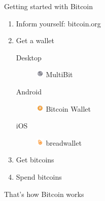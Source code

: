 \documentclass[12pt, usepdftitle=false]{beamer}
\begin{document}
\begin{frame}{Getting started with Bitcoin}
\begin{enumerate}
\pause\item Inform yourself: \alert{bitcoin.org}
\pause\item Get a wallet
\begin{description}
\item[Desktop] \includegraphics[height=1em]{multibit} MultiBit
\item[Android] \includegraphics[height=1em]{bitcoinwallet}  Bitcoin Wallet
\item[iOS] \includegraphics[height=1em]{breadwallet}  breadwallet
\end{description}
\pause\item{Get bitcoins}
\pause\item{Spend bitcoins}
\end{enumerate}
\end{frame}


\begin{frame}{That's how Bitcoin works}
	
\begin{center}
\end{center}

\end{frame}
\end{document}
